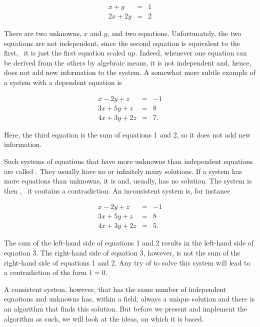 \documentclass[tikz]{scrreprt}
\begin{document}
\begin{equation}
\begin{array}{lcl}
 x +  y & = & 1\\
2x + 2y & = & 2
\end{array}
\end{equation}

There are two unknowns, $x$ and $y$, and two equations.
Unfortunately, the two equations are not independent,
since the second equation is equivalent to the first,
\ie\ it is just the first equation scaled up.
Indeed, whenever one equation can be derived from the others
by algebraic means, it is not independent and, hence,
does not add new information to the system.
A somewhat more subtle example of a system 
with a dependent equation is

\begin{equation}\label{eq_linEqUnder}
\begin{array}{lcl}
 x - 2y +  z & = & -1\\
3x + 5y +  z & = &  8\\
4x + 3y + 2z & = &  7.
\end{array}
\end{equation}

Here, the third equation is the sum of equations 1 and 2,
so it does not add new information.

Such systems of equations that have more unknowns than
independent equations are called .
They usually have no or infinitely many solutions.
If a system has more equations than unknowns, it is
 and, usually, has no solution.
The system is then , \ie\ it contains a
contradiction. An inconsistent system is, for instance

\begin{equation}
\begin{array}{lcl}
 x - 2y +  z & = & -1\\
3x + 5y +  z & = &  8\\
4x + 3y + 2z & = &  5.
\end{array}
\end{equation}

The sum of the left-hand side of equations 1 and 2 results in
the left-hand side of equation 3. 
The right-hand side of equation 3, however,
is not the sum of the right-hand side of equations 1 and 2.
Any try of to solve this system will lead to 
a contradiction of the form $1=0$.

A consistent system, however, that has the same number
of independent equations and unknowns has,
within a field, always a unique
solution and there is an algorithm that finds
this solution.
But before we present and implement the algorithm as such,
we will look at the ideas, on which it is based.
\end{document}
